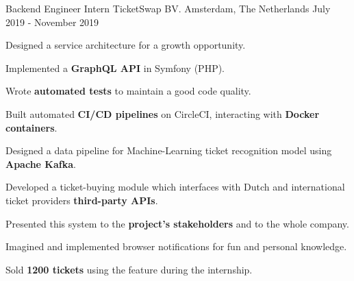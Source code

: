

\begin{cventries}

  \cventry
    {Backend Engineer Intern} %
    {TicketSwap BV.} %
    {Amsterdam, The Netherlands} %
    {July 2019 - November 2019} %
    {
      \begin{cvitems} %
        \item {Designed a service architecture for a growth opportunity.}
        \item {Implemented a \textbf{GraphQL API} in Symfony (PHP).}
        \item {Wrote \textbf{automated tests} to maintain a good code quality.}
        \item {Built automated \textbf{CI/CD pipelines} on CircleCI, interacting with \textbf{Docker containers}.}
        \item {Designed a data pipeline for Machine-Learning ticket recognition model using \textbf{Apache Kafka}.}
        \item {Developed a ticket-buying module which interfaces with Dutch and international ticket providers \textbf{third-party APIs}.}
        \item {Presented this system to the \textbf{project's stakeholders} and to the whole company.}
        \item {Imagined and implemented browser notifications for fun and personal knowledge.}
        \item {Sold \textbf{1200 tickets} using the feature during the internship.}
      \end{cvitems}
    }

\end{cventries}
